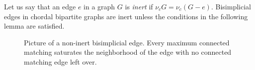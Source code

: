 Let us say that an edge $e$ in a graph $G$  is {\it inert} if $\nu_c{G} = \nu_c(G-e)$.  
%
Bisimplicial edges in chordal bipartite graphs are inert unless the conditions in the following lemma are satisfied.
%
%
\begin{figure}
	\begin{center}
	
	\end{center}
	\label{bisimp_pic}
	\caption{Picture of a non-inert bisimplicial edge.  Every maximum connected matching saturates the neighborhood of the edge with no connected matching edge left over.}
\end{figure}
%
